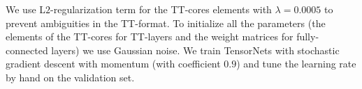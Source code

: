 
We use L$2$-regularization term for the TT-cores elements with $\lambda = 0.0005$ to prevent ambiguities in the TT-format. To initialize all the parameters (the elements of the TT-cores for TT-layers and the weight matrices for fully-connected layers) we use Gaussian noise. We train TensorNets with stochastic gradient descent with momentum (with coefficient $0.9$) and tune the learning rate by hand on the validation set.


